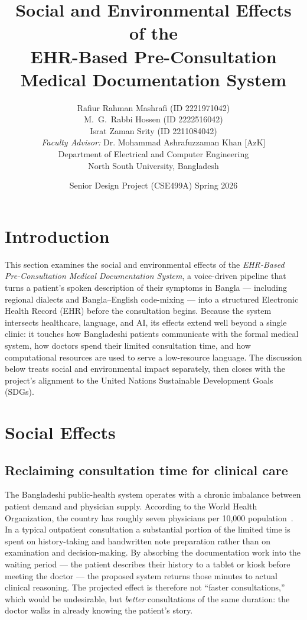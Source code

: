 \documentclass[12pt,a4paper]{article}
\title{\bfseries Social and Environmental Effects of the\\
EHR-Based Pre-Consultation Medical Documentation System}
\author{Rafiur Rahman Mashrafi (ID 2221971042)\\
        M.~G.~Rabbi Hossen (ID 2222516042)\\
        Israt Zaman Srity (ID 2211084042)\\[6pt]
        \emph{Faculty Advisor:} Dr. Mohammad Ashrafuzzaman Khan [AzK]\\
        Department of Electrical and Computer Engineering\\
        North South University, Bangladesh}
\date{Senior Design Project (CSE499A) \quad Spring 2026}
\begin{document}
\maketitle

\section{Introduction}

This section examines the social and environmental effects of the
\textit{EHR-Based Pre-Consultation Medical Documentation System}, a
voice-driven pipeline that turns a patient's spoken description of
their symptoms in Bangla --- including regional dialects and
Bangla--English code-mixing --- into a structured Electronic Health
Record (EHR) before the consultation begins. Because the system
intersects healthcare, language, and AI, its effects extend well
beyond a single clinic: it touches how Bangladeshi patients
communicate with the formal medical system, how doctors spend their
limited consultation time, and how computational resources are used
to serve a low-resource language. The discussion below treats social
and environmental impact separately, then closes with the project's
alignment to the United Nations Sustainable Development Goals (SDGs).

\section{Social Effects}

\subsection{Reclaiming consultation time for clinical care}
The Bangladeshi public-health system operates with a chronic
imbalance between patient demand and physician supply. According to
the World Health Organization, the country has roughly seven
physicians per 10{,}000 population~\cite{rep:who}. In a typical
outpatient consultation a substantial portion of the limited time is
spent on history-taking and handwritten note preparation rather than
on examination and decision-making. By absorbing the documentation
work into the waiting period --- the patient describes their history
to a tablet or kiosk before meeting the doctor --- the proposed
system returns those minutes to actual clinical reasoning. The
projected effect is therefore not ``faster consultations,'' which
would be undesirable, but \emph{better} consultations of the same
duration: the doctor walks in already knowing the patient's story.
\end{document}
